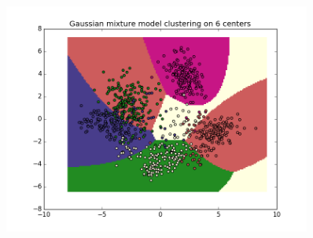 \documentclass{article}
\begin{document}
\begin{center}
\begin{figure}
\centering
\includegraphics[width=0.9\textwidth]{figure_14}
\caption{}
\label{fig:7}
\end{figure}



\end{center}
\end{document}
